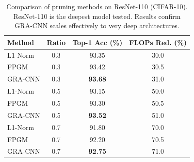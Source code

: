 \begin{table}[ht]
\centering
\caption{Comparison of pruning methods on ResNet-110 (CIFAR-10). ResNet-110 is the deepest model tested. Results confirm GRA-CNN scales effectively to very deep architectures.}
\label{tab:r110}
\begin{tabular}{lccc}
\toprule
Method & Ratio & Top-1 Acc (\%) & FLOPs Red. (\%) \\
\midrule
L1-Norm & 0.3 & 93.35 & 30.0 \\
FPGM & 0.3 & 93.42 & 30.5 \\
GRA-CNN & 0.3 & \textbf{93.68} & 31.0 \\
\midrule
L1-Norm & 0.5 & 93.15 & 50.0 \\
FPGM & 0.5 & 93.30 & 50.5 \\
GRA-CNN & 0.5 & \textbf{93.52} & 51.0 \\
\midrule
L1-Norm & 0.7 & 91.80 & 70.0 \\
FPGM & 0.7 & 92.20 & 70.5 \\
GRA-CNN & 0.7 & \textbf{92.75} & 71.0 \\
\bottomrule
\end{tabular}
\end{table}
